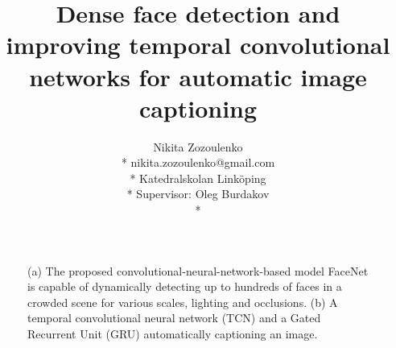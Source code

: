\documentclass[a4paper, twoside]{article}
\title{Dense face detection and improving temporal convolutional networks for automatic image captioning}
\author{Nikita Zozoulenko \\*
nikita.zozoulenko@gmail.com \\*
Katedralskolan Linköping\\*
Supervisor: Oleg Burdakov \\*}
\begin{document}
\maketitle

\vfill
\begin{figure}[h]
    \centering
  	\caption{(a) The proposed convolutional-neural-network-based model FaceNet is capable of dynamically detecting up to hundreds of faces in a crowded scene for various scales, lighting and occlusions. (b) A temporal convolutional neural network (TCN) and a Gated Recurrent Unit (GRU) automatically captioning an image.} \label{figtitle}
\end{figure}
\vfill
\end{document}
